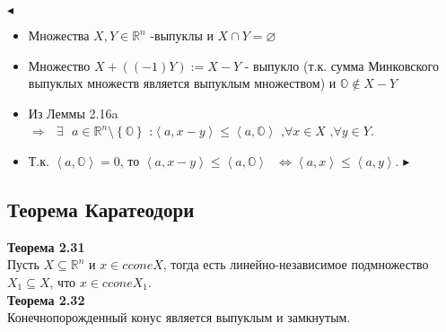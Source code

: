 $\blacktriangleleft$
\begin{itemize}
\item Множества $X,Y \in \mathbb{R}^{n}$ -выпуклы и $X\cap Y = \varnothing$
\item Множество $X + \left( (-1) Y\right):=X-Y$ - выпукло (т.к. сумма Минковского выпуклых множеств является выпуклым множеством) и $\mathbb{O} \notin X-Y$
\item Из Леммы 2.16a $\Longrightarrow \text{ } \exists \text{ } a \in \mathbb{R}^{n} \setminus \left\lbrace \mathbb{O} \right\rbrace \text{ :} \left\langle a, x-y \right\rangle \leq \left\langle a, \mathbb{O}  \right\rangle \text{ ,} \forall x \in X \text{ ,} \forall y \in Y$.
\item Т.к. $ \left\langle a, \mathbb{O}  \right\rangle = 0$, то  $\left\langle a, x-y \right\rangle \leq \left\langle a, \mathbb{O}  \right\rangle \text{ } \Longleftrightarrow \left \langle a,x \right \rangle \leq \left \langle a,y \right \rangle$. $\blacktriangleright$
\end{itemize}
\subsection{Теорема Каратеодори}
\noindent\textbf{Теорема 2.31}\\
Пусть $X \subseteq \mathbb{R}^{n}$ и $x \in cconeX$, тогда есть линейно-независимое подмножество $X_{1} \subseteq X$, что $x\in cconeX_{1}$.\\

\noindent\textbf{Теорема 2.32}\\
Конечнопорожденный конус является выпуклым и замкнутым.\\

